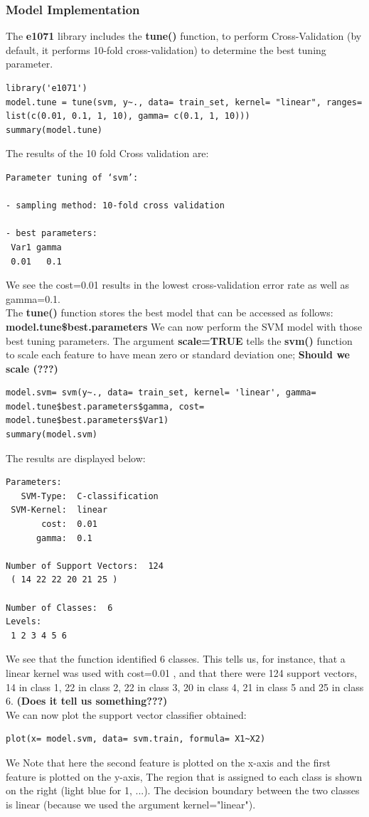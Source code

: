 \documentclass[]{report}
\begin{document}
\subsubsection{Model Implementation}
The \textbf{e1071} library includes the \textbf{tune()} function, to perform Cross-Validation (by default, it performs 10-fold cross-validation) to determine the best tuning parameter.
\begin{lstlisting}
library('e1071')
model.tune = tune(svm, y~., data= train_set, kernel= "linear", ranges= list(c(0.01, 0.1, 1, 10), gamma= c(0.1, 1, 10)))
summary(model.tune)
\end{lstlisting}
The results of the 10 fold Cross validation are:

\begin{verbatim}
Parameter tuning of ‘svm’:

- sampling method: 10-fold cross validation 

- best parameters:
 Var1 gamma
 0.01   0.1
\end{verbatim}
We see the cost=0.01 results in the lowest cross-validation error rate as well as gamma=0.1.\\
The \textbf{tune()} function stores the best model that can be accessed as follows: \textbf{model.tune\$best.parameters} We can now perform the SVM model with those best tuning parameters.
The argument \textbf{scale=TRUE} tells the \textbf{svm()} function to scale each feature to have mean zero or standard deviation one;\textbf{ Should we scale (???)}

\begin{lstlisting}
model.svm= svm(y~., data= train_set, kernel= 'linear', gamma= model.tune$best.parameters$gamma, cost= model.tune$best.parameters$Var1)
summary(model.svm)
\end{lstlisting}

The results are displayed below:
\begin{verbatim}
Parameters:
   SVM-Type:  C-classification 
 SVM-Kernel:  linear 
       cost:  0.01 
      gamma:  0.1 

Number of Support Vectors:  124
 ( 14 22 22 20 21 25 )

Number of Classes:  6 
Levels: 
 1 2 3 4 5 6
\end{verbatim}
We see that the function identified 6 classes. This tells us, for instance, that a linear kernel was used with cost=0.01 , and that there were 124 support vectors, 14 in class 1, 22 in class 2, 22 in class 3, 20 in class 4, 21 in class 5 and 25 in class 6. \textbf{(Does it tell us something???)}
\\
We can now plot the support vector classifier obtained:
\begin{lstlisting}
plot(x= model.svm, data= svm.train, formula= X1~X2)
\end{lstlisting}
We Note that here the second feature is plotted on the x-axis and the first feature is plotted on the y-axis, 
The region that is assigned to each class is shown on the right (light blue for 1, ...). The decision boundary between the two classes is linear 
(because we used the argument kernel="linear"). 
\end{document}

